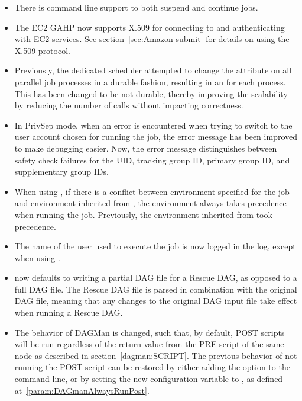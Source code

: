 \begin{itemize}

\item There is command line support to both suspend and continue jobs. 

\item The EC2 GAHP now supports X.509 for connecting to and authenticating
with EC2 services.  See section~\ref{sec:Amazon-submit} for details
on using the X.509 protocol.

\item Previously, the dedicated scheduler attempted to change the
 attribute on all parallel job processes in a durable fashion,
resulting in an  for each process.
This has been changed to be not durable, 
thereby improving the scalability by reducing the 
number of  calls without impacting correctness. 

\item In PrivSep mode, when an error is encountered when trying to
switch to the user account chosen for running the job, 
the error message has been improved to make debugging easier.  
Now, the error message distinguishes between safety check failures 
for the UID, tracking group ID, primary group ID, and supplementary group IDs.

\item When using , if there is a conflict between
environment specified for the job and environment inherited from ,
the environment always takes precedence when running the job.
Previously, the environment inherited from  took precedence.

\item The name of the user used to execute the job is now logged in
the  log, except when using .

\item {} now defaults to writing a partial DAG file
for a Rescue DAG,
as opposed to a full DAG file.
The Rescue DAG file is parsed in combination with the original DAG file, 
meaning that any
changes to the original DAG input file take effect when running a Rescue DAG.

\item The behavior of DAGMan is changed, such that, by default, 
POST scripts will be run regardless of the return value from 
the PRE script of the same node as described in section~\ref{dagman:SCRIPT}.  
The previous behavior of not running the POST script can be restored by
either adding the  option to the 
command line, 
or by setting the new configuration variable
 to , 
as defined at~\ref{param:DAGmanAlwaysRunPost}.


\end{itemize}
